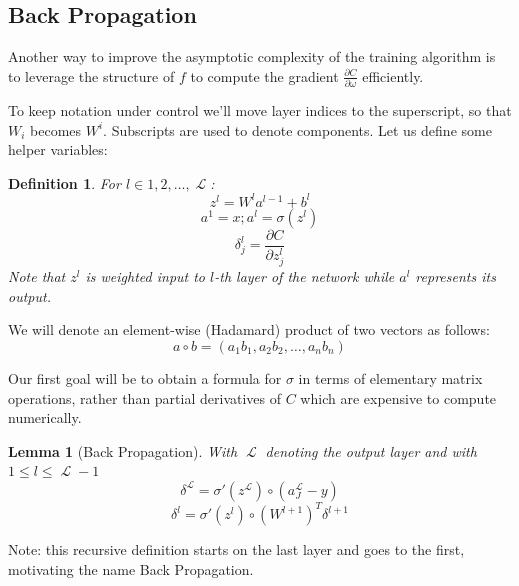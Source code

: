 \documentclass[a4paper]{article}
\theoremstyle{break}
\newtheorem{definition}{Definition}[section]
\newtheorem{lemma}[theorem]{Lemma}
\newcommand{\Part}[2]{\frac{\partial #1}{\partial #2}}
\DeclareMathOperator{\La}{\mathcal{L}}
\begin{document}
\subsection{Back Propagation}
Another way to improve the asymptotic complexity of the training algorithm is to leverage the structure of $f$ to compute the gradient $ \frac{\partial C}{\partial \omega} $ efficiently.

To keep notation under control we'll move layer indices to the superscript, so that $W_i$ becomes $ W^i $. Subscripts are used to denote components. Let us define some helper variables:
\begin{definition}\label{def:back_prop_helper}
For $ l \in {1, 2, \ldots, \La} $:
    $$ z^l = W^l a^{l-1} + b^{l} $$
    $$ a^1 = x; a^l = \sigma( z^l ) $$
    $$ \delta^l_j = \Part{C}{ z_j^l } $$
Note that $z^l$ is weighted input to $l$-th layer of the network while $a^l$ represents its output.
\end{definition}

We will denote an element-wise (Hadamard) product of two vectors as follows:
    \newcommand{\hadam}{\circ}
    $$ a \hadam b = (a_1 b_1, a_2 b_2, \ldots, a_n b_n)$$

Our first goal will be to obtain a formula for $\sigma$ in terms of elementary matrix operations, rather than partial derivatives of $C$ which are expensive to compute numerically.

\begin{lemma}[Back Propagation]\label{lem:back_propagation}
With $\La$ denoting the output layer and with $ 1 \leq l \leq \La - 1$ 
\begin{equation}\label{eq:last_sigma}
   \delta^{\La} = \sigma'(z^{\La}) \hadam (a_J^{\La} - y ) 
\end{equation}
\begin{equation}\label{eq:previous_sigma}
    \delta^l = \sigma'(z^l) \hadam (W^{l+1})^T \delta^{l+1}
\end{equation}
\end{lemma}

Note: this recursive definition starts on the last layer and goes to the first, motivating the name Back Propagation.
\end{document}
